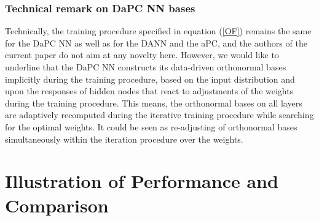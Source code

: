 \documentclass[a4paper,fleqn]{article}
\begin{document}
\subsubsection{Technical remark on DaPC NN bases}

Technically, the training procedure specified in equation (\ref{OF}) remains the same for the DaPC NN as well as for the DANN and the aPC, and the authors of the current paper do not aim at any novelty here. However, we would like to underline that the DaPC NN constructs its data-driven orthonormal bases implicitly during the training procedure, based on the input distribution and upon the responses of hidden nodes that react to adjustments of the weights during the training procedure. This means, the orthonormal bases on all layers are adaptively recomputed during the iterative training procedure while searching for the optimal weights. It could be seen as re-adjusting of orthonormal bases simultaneously within the iteration procedure over the weights. %

\section{Illustration of Performance and Comparison}
\label{Results}
\end{document}
